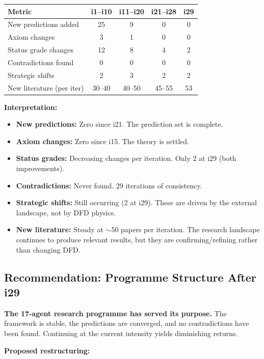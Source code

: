 \documentclass[11pt,a4paper]{article}
\begin{document}
\begin{center}
\begin{tabular}{lcccc}
\toprule
\textbf{Metric} & \textbf{i1--i10} & \textbf{i11--i20} & \textbf{i21--i28} & \textbf{i29} \\
\midrule
New predictions added & 25 & 9 & 0 & 0 \\
Axiom changes & 3 & 1 & 0 & 0 \\
Status grade changes & 12 & 8 & 4 & 2 \\
Contradictions found & 0 & 0 & 0 & 0 \\
Strategic shifts & 2 & 3 & 2 & 2 \\
New literature (per iter) & 30--40 & 40--50 & 45--55 & 53 \\
\bottomrule
\end{tabular}
\end{center}

\textbf{Interpretation:}
\begin{itemize}
\item \textbf{New predictions:} Zero since i21. The prediction set is complete.
\item \textbf{Axiom changes:} Zero since i15. The theory is settled.
\item \textbf{Status grades:} Decreasing changes per iteration. Only 2 at i29 (both improvements).
\item \textbf{Contradictions:} Never found. 29 iterations of consistency.
\item \textbf{Strategic shifts:} Still occurring (2 at i29). These are driven by the external landscape, not by DFD physics.
\item \textbf{New literature:} Steady at $\sim$50 papers per iteration. The research landscape continues to produce relevant results, but they are confirming/refining rather than changing DFD.
\end{itemize}

\subsection{Recommendation: Programme Structure After i29}

\textbf{The 17-agent research programme has served its purpose.} The framework is stable, the predictions are converged, and no contradictions have been found. Continuing at the current intensity yields diminishing returns.

\textbf{Proposed restructuring:}
\end{document}
